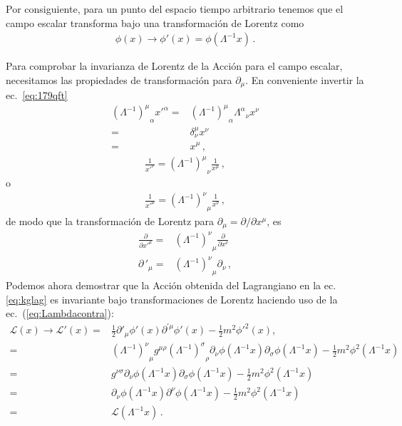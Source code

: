 \begin{frame}

Por consiguiente, para un punto del espacio tiempo arbitrario tenemos
que el campo escalar transforma bajo una transformación de Lorentz como
\begin{align}
  \label{eq:scalarlorentz}
 \phi(x)\to  \phi'(x)=\phi(\Lambda^{-1}x)\,.
\end{align}
\end{frame}

Para comprobar la invarianza de Lorentz de la Acción para el campo escalar, necesitamos las propiedades de transformación para $\partial_\mu$. En conveniente invertir la ec.~\eqref{eq:179qft}
\begin{align}
  {\left(\Lambda^{-1}\right)^\mu}_\alpha{x'}^\alpha=&{\left(\Lambda^{-1}\right)^\mu}_\alpha{\Lambda^\alpha}_\nu x^\nu\nonumber\\
=&\delta^\mu_\nu x^\nu\nonumber\\
=&x^\mu\,,
\end{align}
\begin{align}
  \frac{1}{{x'}^\nu}= {\left(\Lambda^{-1}\right)^\mu}_\nu\frac{1}{x^\mu}\,,
\end{align}
o
\begin{align}
  \label{eq:183qft}
    \frac{1}{{x'}^\mu}= {\left(\Lambda^{-1}\right)^\nu}_\mu\frac{1}{x^\nu}\,,
\end{align}
de modo que la transformación de Lorentz para $\partial_\mu=\partial/\partial x^\mu$, es
\begin{align}
  \label{dmulrtran}
   \frac{\partial}{{\partial x'}^\mu}=& {\left(\Lambda^{-1}\right)^\nu}_\mu\frac{\partial}{\partial x^\nu}\nonumber\\
   {\partial\,}'_\mu=& {\left(\Lambda^{-1}\right)^\nu}_\mu\partial_\nu\,,
\end{align}
Podemos ahora demostrar que la Acción obtenida del Lagrangiano en la ec.\eqref{eq:kglag} es invariante bajo transformaciones de Lorentz haciendo uso de la ec.~(\ref{eq:Lambdacontra}):
\begin{align}
  \mathcal{L}(x)\to  \mathcal{L}'(x)=& \frac{1}{2}\partial'_\mu\phi'(x)\partial^{'\mu}\phi'(x)-\frac{1}{2}m^2{\phi'}^{2}(x), \nonumber\\
  =&{\left(\Lambda^{-1}\right)^\nu}_\mu g^{\mu \rho}{\left(\Lambda^{-1}\right)^\sigma}_\rho \partial_\nu\phi(\Lambda^{-1}x) \partial_\sigma \phi(\Lambda^{-1}x) -\frac{1}{2}m^2\phi^{2}(\Lambda^{-1}x)\nonumber\\
  =& g^{\nu \sigma}\partial_\nu\phi(\Lambda^{-1}x) \partial_\sigma \phi(\Lambda^{-1}x) -\frac{1}{2}m^2\phi^{2}(\Lambda^{-1}x)\nonumber\\
  =& \partial_\nu\phi(\Lambda^{-1}x) \partial^{\nu} \phi(\Lambda^{-1}x) -\frac{1}{2}m^2\phi^{2}(\Lambda^{-1}x)\nonumber\\
  =&\mathcal{L}(\Lambda^{-1}x)\,.
\end{align}
